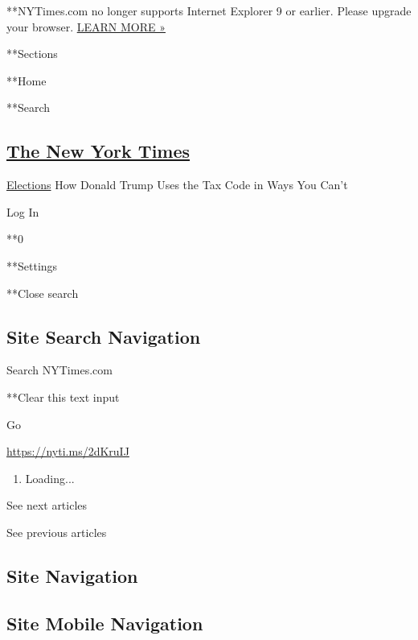  **NYTimes.com no longer supports Internet Explorer 9 or earlier. Please
upgrade your browser.
\href{http://www.nytimes3xbfgragh.onion/content/help/site/ie9-support.html}{LEARN
MORE »}

**Sections

**Home

**Search

\hypertarget{the-new-york-times}{%
\subsection{\texorpdfstring{\href{http://www.nytimes3xbfgragh.onion/}{The
New York Times}}{The New York Times}}\label{the-new-york-times}}

 \href{/news-event/2020-election}{Elections} \textbar{}How Donald Trump
Uses the Tax Code in Ways You Can't

Log In

**0

**Settings

**Close search

\hypertarget{site-search-navigation}{%
\subsection{Site Search Navigation}\label{site-search-navigation}}

Search NYTimes.com

**Clear this text input

Go

\url{https://nyti.ms/2dKruIJ}

\begin{enumerate}
\def\labelenumi{\arabic{enumi}.}
\item
  Loading...
\end{enumerate}

See next articles

See previous articles

\hypertarget{site-navigation}{%
\subsection{Site Navigation}\label{site-navigation}}

\hypertarget{site-mobile-navigation}{%
\subsection{Site Mobile Navigation}\label{site-mobile-navigation}}

